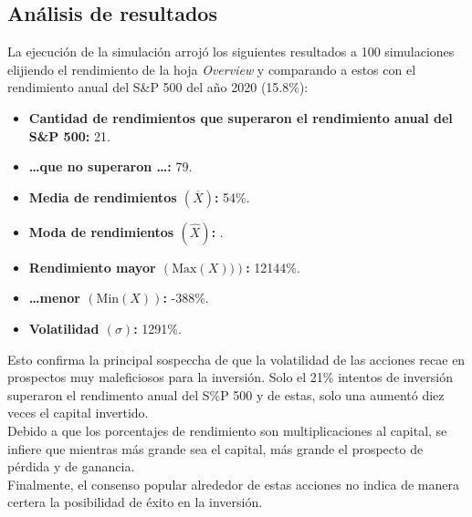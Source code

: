 \documentclass[letterpaper, 12pt]{article}
\begin{document}
\begin{justify}
        \section{Análisis de resultados} %
        \justify
        La ejecución de la simulación arrojó los siguientes resultados a 100 simulaciones elijiendo el rendimiento de la 
        hoja \emph{Overview} y comparando a estos con el rendimiento anual del S\&P 500 del año 2020 (15.8\%):
        \begin{itemize}
            \item \textbf{Cantidad de rendimientos que superaron el rendimiento anual del S\&P 500:} 21.
            \item \textbf{\dots que no superaron \dots:} 79.
            \item \textbf{Media de rendimientos \(\left(\overline{X}\right)\):} 54\%.
            \item \textbf{Moda de rendimientos \(\left(\hat{X}\right)\):} .
            \item \textbf{Rendimiento mayor \(\left(\text{Max}\left(X\right))\right)\):} 12144\%.
            \item \textbf{\dots menor \(\left(\text{Min}\left(X\right)\right)\):} -388\%.
            \item \textbf{Volatilidad \((\sigma)\):} 1291\%.
        \end{itemize}
        Esto confirma la principal sospeccha de que la volatilidad de las acciones recae en prospectos muy maleficiosos para la inversión. Solo el 21\%
        intentos de inversión superaron el rendimento anual del S\%P 500 y de estas, solo una aumentó diez veces el capital invertido.
        \\\newline
        Debido a que los porcentajes de rendimiento son multiplicaciones al capital, se infiere que mientras más grande sea el capital, más grande el prospecto de pérdida y de ganancia.
        \\\newline
        Finalmente, el consenso popular alrededor de estas acciones no indica de manera certera la posibilidad de éxito en la inversión. 

\end{justify}
\end{document}
